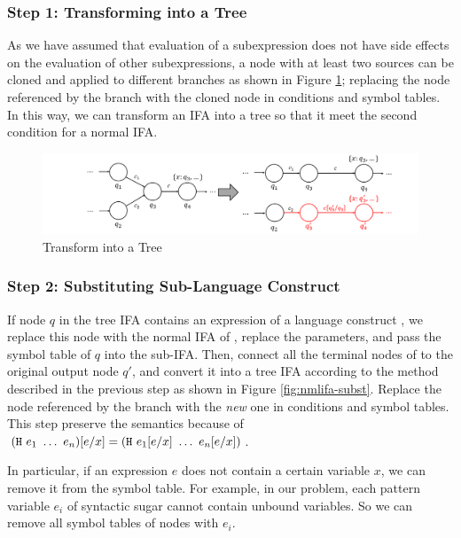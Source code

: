 \subsubsection*{Step 1: Transforming into a Tree}

As we have assumed that evaluation of a subexpression does not have side effects on the evaluation of other subexpressions, a node with at least two sources can be cloned and applied to different branches as shown in Figure \ref{fig:nmlifa-tree}; replacing the node referenced by the branch with the cloned node in conditions and symbol tables.  In this way, we can transform an IFA into a tree so that it meet the second condition for a normal IFA.

\begin{figure}[t]
    \centering
    \includegraphics[scale=0.25]{images/nmlifa/nmlifa-tree.png}
    \caption{Transform into a Tree}
    \label{fig:nmlifa-tree}
\end{figure}

\subsubsection*{Step 2: Substituting Sub-Language Construct}
\label{mark:hygieneinderive}

If node $q$ in the tree IFA contains an expression of a language construct , we replace this node with the normal IFA of , replace the parameters, and pass the symbol table of $q$ into the sub-IFA. Then, connect all the terminal nodes of  to the original output node $q'$, and convert it into a tree IFA according to the method described in the previous step as shown in Figure \ref{fig:nmlifa-subst}. Replace the node referenced by the branch with the \textit{new} one in conditions and symbol tables. This step preserve the semantics because of $(\mbox{\tt H}~e_1~\ldots~e_n)[e/x] = (\mbox{\tt H}~e_1[e/x]~\ldots~e_n[e/x])$.

In particular, if an expression $e$ does not contain a certain variable $x$, we can remove it from the symbol table. For example, in our problem, each pattern variable $e_i$ of syntactic sugar cannot contain unbound variables. So we can remove all symbol tables of nodes with $e_i$.

